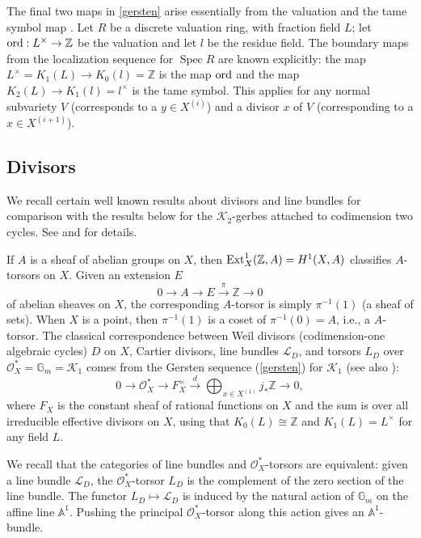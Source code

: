\documentclass{amsart}
\numberwithin{equation}{subsection}
\theoremstyle{remark}
\theoremstyle{remark}
\newcommand{\too}{\longrightarrow}%
\newcommand{\cK}{\mathcal{K}}
\newcommand{\cL}{\mathcal{L}}
\newcommand{\cO}{\mathcal{O}}
\newcommand{\bbG}{\mathbb{G}}
\newcommand{\bbZ}{\mathbb{Z}}
\DeclareMathOperator{\Spec}{Spec}
\begin{document}
The final two maps in \eqref{gersten} arise essentially from the valuation and the tame symbol map \cite[pp.351-2]{Bloch}. Let $R$ be a discrete valuation ring, with fraction field $L$; let ${\rm ord}: L^{\times} \to \bbZ$ be the valuation and let $l$ be the residue field. The boundary maps from the localization sequence for $\Spec R$ are known explicitly: the map $L^{\times} = K_1(L) \to K_0(l) = \bbZ$ is the map ${\rm ord}$ and the map $K_2(L) \to K_1(l) = l^{\times}$ is the tame symbol. This applies for any normal subvariety $V$ (corresponds to a $y \in X^{(i)}$) and a divisor $x$ of $V$ (corresponding to a $x \in X^{(i+1)}$). 

\subsection{Divisors}\label{divisors} We recall certain well known results about divisors and line bundles for comparison with  the results below for the $\cK_2$-gerbes attached to codimension two cycles. See \cite[Chapter II \S 6]{Hartshorne} and \cite[Vol. 1, II.2]{handbook} for details.

If $A$ is a sheaf of abelian groups on $X$, then ${\rm Ext}_X^1(\mathbb Z, A) = H^1(X, A)$ classifies $A$-torsors on $X$. Given an extension $E$
\begin{equation*}
  0 \too A \too E \overset{\pi}{\too} \bbZ \too 0
\end{equation*}
of abelian sheaves on $X$, the corresponding $A$-torsor is simply $\pi^{-1}(1)$ (a sheaf of sets). When $X$ is a point, then $\pi^{-1}(1)$ is a coset of $\pi^{-1}(0) = A$, i.e., a $A$-torsor. The classical correspondence \cite{Hartshorne} between Weil divisors (codimension-one algebraic cycles) $D$ on $X$, Cartier divisors,  line bundles $\cL_D$, and  torsors $L_D$ over $\cO_X^* =\bbG_m =\cK_1$ comes from the Gersten sequence (\ref{gersten}) for $\cK_1$ (see also \cite[2.2]{Gerstenicm}): 
\begin{equation}\label{gersten1}
 0 \too \cO_X^* \too F_X^{\times} \overset{d}{\too} \bigoplus_{x \in X^{(1)}} j_*\bbZ \to 0,
 \end{equation}
 where $F_X$ is the constant sheaf of rational functions on $X$ and the sum is over all irreducible effective divisors on $X$, using that $K_0(L) \cong \bbZ$ and $K_1(L) = L^{\times}$ for any field $L$. 

We recall that the categories of line bundles and $\cO_X^*$-torsors are equivalent: given a line bundle $\cL_D$, the $\cO_X^*$-torsor $L_D$ is the complement of the zero section of the line bundle.  The functor $L_D \mapsto \cL_D$ is  induced by the natural action of $\mathbb G_m$ on the affine line $\mathbb A^1$. Pushing the principal $\cO_X^*$-torsor along this action gives an $\mathbb A^1$-bundle. 
 
\end{document}

